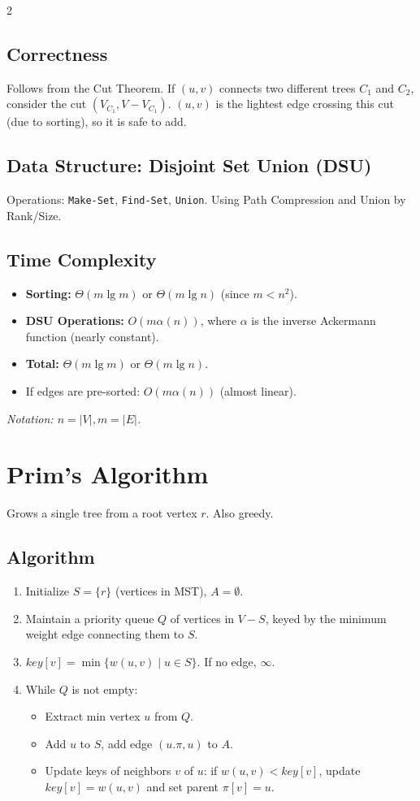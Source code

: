 \documentclass[10pt, a4paper]{article}
\begin{document}
\begin{multicols*}{2}
\subsection{Correctness}
Follows from the Cut Theorem. If $(u, v)$ connects two different trees $C_1$ and $C_2$, consider the cut $(V_{C_1}, V - V_{C_1})$. $(u, v)$ is the lightest edge crossing this cut (due to sorting), so it is safe to add.

\subsection{Data Structure: Disjoint Set Union (DSU)}
Operations: \texttt{Make-Set}, \texttt{Find-Set}, \texttt{Union}.
Using Path Compression and Union by Rank/Size.

\subsection{Time Complexity}
\begin{itemize}[leftmargin=*]
    \item \textbf{Sorting:} $\Theta(m \lg m)$ or $\Theta(m \lg n)$ (since $m < n^2$).
    \item \textbf{DSU Operations:} $O(m \alpha(n))$, where $\alpha$ is the inverse Ackermann function (nearly constant).
    \item \textbf{Total:} $\Theta(m \lg m)$ or $\Theta(m \lg n)$.
    \item If edges are pre-sorted: $O(m \alpha(n))$ (almost linear).
\end{itemize}
\textit{Notation: $n = |V|, m = |E|$.}

\section{Prim's Algorithm}
Grows a single tree from a root vertex $r$. Also greedy.

\subsection{Algorithm}
\begin{enumerate}[leftmargin=*]
    \item Initialize $S = \{r\}$ (vertices in MST), $A = \emptyset$.
    \item Maintain a priority queue $Q$ of vertices in $V-S$, keyed by the minimum weight edge connecting them to $S$.
    \item $key[v] = \min \{w(u, v) \mid u \in S\}$. If no edge, $\infty$.
    \item While $Q$ is not empty:
    \begin{itemize}
        \item Extract min vertex $u$ from $Q$.
        \item Add $u$ to $S$, add edge $(u.\pi, u)$ to $A$.
        \item Update keys of neighbors $v$ of $u$: if $w(u, v) < key[v]$, update $key[v] = w(u, v)$ and set parent $\pi[v] = u$.
    \end{itemize}
\end{enumerate}


\end{multicols*}
\end{document}
